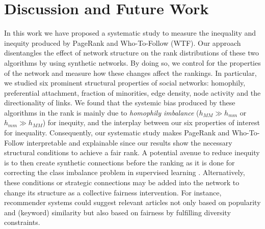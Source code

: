 \documentclass[fleqn,10pt]{wlscirep}
\begin{document}
\section*{Discussion and Future Work}
In this work we have proposed a systematic study to measure the inequality and inequity produced by PageRank and Who-To-Follow (WTF). Our approach disentangles the effect of network structure on the rank distributions of these two algorithms by using synthetic networks. By doing so, we control for the properties of the network and measure how these changes affect the rankings. In particular, we studied six prominent structural properties of social networks: homophily, preferential attachment, fraction of minorities, edge density, node activity and the directionality of links. We found that the systemic bias produced by these algorithms in the rank is mainly due to \textit{homophily imbalance} ($h_{MM}\gg h_{mm}$ or $h_{mm}\gg h_{MM}$) for inequity, and the interplay between our six properties of interest for inequality.
Consequently, our systematic study makes PageRank and Who-To-Follow interpretable and explainable since our results show the necessary structural conditions to achieve a fair rank.
A potential avenue to reduce inequity is to then create synthetic connections before the ranking as it is done for correcting the class imbalance problem in supervised learning \cite{chawla2002smote}.
Alternatively, these conditions or strategic connections may be added into the network to change its structure as a collective fairness intervention. 
For instance, recommender systems could suggest relevant articles not only based on popularity and (keyword) similarity but also based on fairness by fulfilling diversity constraints. 
\end{document}
